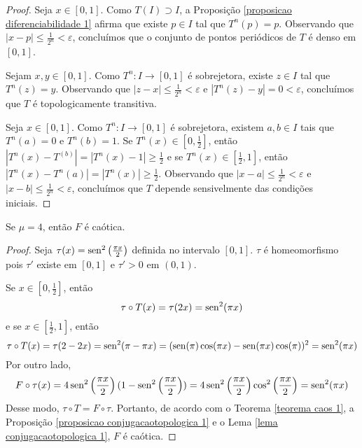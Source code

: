 \begin{proof}
Seja $x \in [0,1]$. Como $T(I) \supset I$, a Proposição \ref{proposicao diferenciabilidade 1} afirma que existe $p \in I$ tal que $T^n(p) = p$. Observando que $|x-p| \leq \frac{1}{2^n} < \varepsilon$, concluímos que o conjunto de pontos periódicos de $T$ é denso em $[0,1]$.

Sejam $x, y \in [0,1]$. Como $T^n: I \to [0,1]$ é sobrejetora, existe $z \in I$ tal que $T^n(z) = y$. Observando que $|z - x| \leq \frac{1}{2^n} < \varepsilon$ e $|T^n(z) - y| = 0 < \varepsilon$, concluímos que $T$ é topologicamente transitiva.

Seja $x \in [0,1]$.  Como $T^n: I \to [0,1]$ é sobrejetora, existem $a, b \in I$ tais que $T^n(a) = 0$ e $T^n(b) = 1$. Se $T^n(x) \in [0, \frac{1}{2}]$, então $|T^n(x) - T^(b)| = |T^n(x) - 1| \geq \frac{1}{2}$ e se $T^n(x) \in [\frac{1}{2}, 1]$, então $|T^n(x) - T^n(a)| = |T^n(x)| \geq \frac{1}{2}$. Observando que $|x - a| \leq \frac{1}{2^n} < \varepsilon$ e $|x - b| \leq \frac{1}{2^n} < \varepsilon$, concluímos que $T$ depende sensivelmente das condições iniciais.
\end{proof}

\begin{theorem}
Se $\mu = 4$, então $F$ é caótica.
\end{theorem}

\begin{proof}
Seja $\tau(x) = \operatorname{sen}^2\left(\frac{\pi x}{2}\right)$ definida no intervalo $ [0,1]$. $\tau$ é homeomorfismo pois $\tau'$ existe em $[0,1]$ e $\tau' > 0$ em $(0,1)$.

Se $x \in \left[0, \frac{1}{2}\right]$, então $$\tau \circ T(x) = \tau(2x) = \operatorname{sen}^2(\pi x)$$
e se $x \in \left[\frac{1}{2}, 1\right]$, então $$\tau \circ T(x) = \tau(2 - 2x) = \operatorname{sen}^2(\pi- \pi x) = (\operatorname{sen}(\pi)\cos(\pi x) - \operatorname{sen}(\pi x)\cos(\pi))^2 = \operatorname{sen}^2(\pi x)$$
Por outro lado, $$F \circ \tau(x) = 4\operatorname{sen}^2\left(\frac{\pi x}{2}\right)(1 - \operatorname{sen}^2\left(\frac{\pi x}{2}\right)) = 4\operatorname{sen}^2\left(\frac{\pi x}{2}\right)\cos^2\left(\frac{\pi x}{2}\right) = \operatorname{sen}^2(\pi x)$$
Desse modo, $\tau \circ T = F \circ \tau$. Portanto, de acordo com o Teorema \ref{teorema caos 1}, a Proposição \ref{proposicao conjugacaotopologica 1} e o Lema \ref{lema conjugacaotopologica 1}, $F$ é caótica.
\end{proof}
